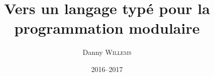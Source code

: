\documentclass[10pt,a4paper]{memoire-umons}
\title{Vers un langage typé pour la programmation modulaire}
\author{Danny \textsc{Willems}}
\date{2016--2017}
\begin{document}
\newcommand{\localLetBinding}[3]{let \; #1 \; = \; #2 \; in \; #3}



\tableofcontents














\end{document}
